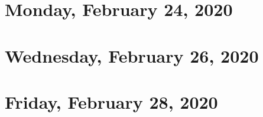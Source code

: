 \documentclass{../mynotes}
\begin{document}
\section{Monday, February 24, 2020}
	
\section{Wednesday, February 26, 2020}
    
\section{Friday, February 28, 2020}
    

% 	
%     
%     

% 	
%     
%     
\end{document}
